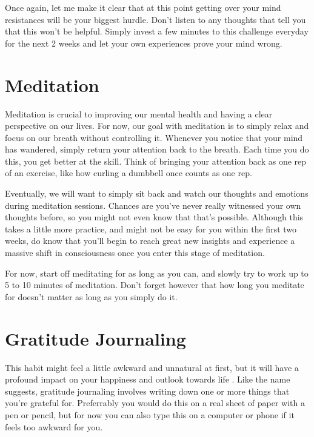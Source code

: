 \documentclass[
]{book}
\begin{document}
Once again, let me make it clear that at this point getting over your mind resistances will be your biggest hurdle. Don't listen to any thoughts that tell you that this won't be helpful. Simply invest a few minutes to this challenge everyday for the next 2 weeks and let your own experiences prove your mind wrong.

\hypertarget{meditation}{%
\section{Meditation}\label{meditation}}

Meditation is crucial to improving our mental health and having a clear perspective on our lives. For now, our goal with meditation is to simply relax and focus on our breath without controlling it. Whenever you notice that your mind has wandered, simply return your attention back to the breath. Each time you do this, you get better at the skill. Think of bringing your attention back as one rep of an exercise, like how curling a dumbbell once counts as one rep.

Eventually, we will want to simply sit back and watch our thoughts and emotions during meditation sessions. Chances are you've never really witnessed your own thoughts before, so you might not even know that that's possible. Although this takes a little more practice, and might not be easy for you within the first two weeks, do know that you'll begin to reach great new insights and experience a massive shift in consciousness once you enter this stage of meditation.

For now, start off meditating for as long as you can, and slowly try to work up to 5 to 10 minutes of meditation. Don't forget however that how long you meditate for doesn't matter as long as you simply do it.

\hypertarget{gratitude-journaling}{%
\section{Gratitude Journaling}\label{gratitude-journaling}}

This habit might feel a little awkward and unnatural at first, but it will have a profound impact on your happiness and outlook towards life \citep{gratitude}. Like the name suggests, gratitude journaling involves writing down one or more things that you're grateful for. Preferrably you would do this on a real sheet of paper with a pen or pencil, but for now you can also type this on a computer or phone if it feels too awkward for you.
\end{document}
